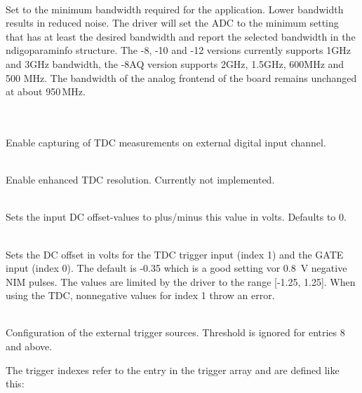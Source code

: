             \\
            Set to the minimum bandwidth required for the application. Lower bandwidth results in reduced noise. The driver will set the ADC to the minimum setting that has at least the desired bandwidth and report the selected bandwidth in the \textsf{ndigo\tu param\tu info} structure. The -8, -10 and -12 versions currently supports 1GHz and 3GHz bandwidth, the -8AQ version supports 2GHz, 1.5GHz, 600MHz and 500 MHz. The bandwidth of the analog frontend of the board remains unchanged at about 950\,MHz.
            \par

            \\
            \\
            Enable capturing of TDC measurements on external digital input channel.\par

            \\
            Enable enhanced TDC resolution. Currently not implemented.\par

            \\
            Sets the input DC offset-values to plus/minus this value in volts. Defaults to 0.\par

            \\
            Sets the DC offset in volts for the TDC trigger input (index 1) and the GATE input (index 0). The default is -0.35 which is a good setting vor \SI{0.8}{\volt} negative NIM pulses.
            The values are limited by the driver to the range [-1.25, 1.25]. When using the TDC, nonnegative values for index 1 throw an error. \par

            \\
            Configuration of the external trigger sources. Threshold is ignored for entries 8 and above.\par

            The trigger indexes refer to the entry in the trigger array and are defined like this:\par


